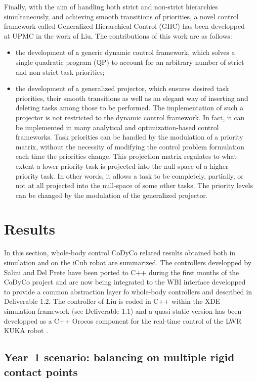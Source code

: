 \documentclass[12pt,a4paper,twoside]{article}
\begin{document}
Finally, with the aim of handling both strict and non-strict hierarchies simultaneously, and achieving smooth transitions of priorities, a novel control framework called Generalized Hierarchical Control (GHC) has been developped at UPMC in the work of Liu. The contributions of this work are as follows:
\begin{itemize}
\item the development of a generic dynamic control framework, which solves a single quadratic program (QP) to account for an arbitrary number of strict and non-strict task priorities;
\item the development of a generalized projector, which ensures desired task priorities, their smooth transitions as well as an elegant way of inserting and deleting tasks among those to be performed. The implementation of such a projector is not restricted to the dynamic control framework. In fact, it can be implemented in many analytical and optimization-based control frameworks. Task priorities can be handled by the modulation of a priority matrix, without the necessity of modifying the control problem formulation each time the priorities change. This projection matrix regulates to what extent a lower-priority task is projected into the null-space of a higher-priority task. In other words, it allows a task to be completely, partially, or not at all projected into the null-space of some other tasks. The priority levels can be changed by the modulation of the generalized projector.
\end{itemize}

\section{Results}

In this section, whole-body control CoDyCo related results obtained both in simulation and on the iCub robot are summarized. The controllers developped by Salini and Del Prete have been ported to C++ during the first months of the CoDyCo project and are now being integrated to the WBI interface developped to provide a common abstraction layer fo whole-body controllers and described in Deliverable 1.2. The controller of Liu is coded in C++ within the XDE simulation framework (see Deliverable 1.1) and a quasi-static version has been developped as a C++ Orocos component \cite{Bruyninckx2001} for the real-time control of the LWR KUKA robot \cite{liu_ICRA2015}.

\subsection{Year~1 scenario: balancing on multiple rigid contact points}
\end{document}

